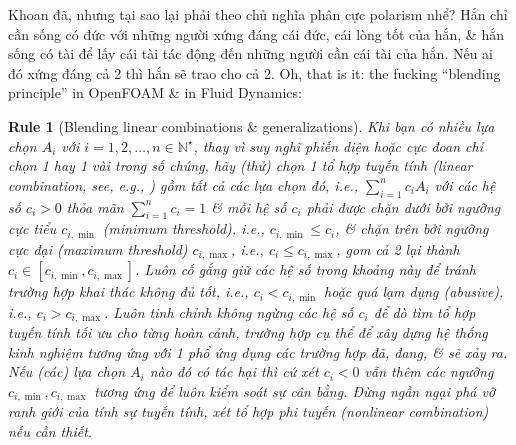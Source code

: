 \documentclass[12pt]{article}
\newtheorem{Rule}{Rule}
\begin{document}
Khoan đã, nhưng tại sao lại phải theo chủ nghĩa phân cực polarism nhể? Hắn chỉ cần sống có đức với những người xứng đáng cái đức, cái lòng tốt của hắn, \& hắn sống có tài để lấy cái tài tác động đến những người cần cái tài của hắn. Nếu ai đó xứng đáng cả 2 thì hắn sẽ trao cho cả 2. Oh, that is it: the fucking ``blending principle'' in OpenFOAM \& in Fluid Dynamics:

\begin{Rule}[Blending linear combinations \& generalizations]
	Khi bạn có nhiều lựa chọn $A_i$ với $i = 1,2,\ldots,n\in\mathbb{N}^\star$, thay vì suy nghĩ phiến diện hoặc cực đoan chỉ chọn 1 hay 1 vài trong số chúng, hãy (thử) chọn 1 tổ hợp tuyến tính (linear combination, see, e.g., {\rm\cite{Hung_linear_algebra,Trefethen_Bau1997,Trefethen_Bau2022}}) gồm tất cả các lựa chọn đó, i.e., $\sum_{i = 1}^n c_iA_i$ với các hệ số $c_i > 0$ thỏa mãn $\sum_{i = 1}^n c_i = 1$ \& mỗi hệ số $c_i$ phải được chặn dưới bởi ngưỡng cực tiểu $c_{i,\min}$ (minimum threshold), i.e., $c_{i,\min}\le c_i$, \& chặn trên bởi ngưỡng cực đại (maximum threshold) $c_{i,\max}$, i.e., $c_i\le c_{i,\max}$, gom cả 2 lại thành $c_i\in[c_{i,\min},c_{i,\max}]$. Luôn cố gắng giữ các hệ số trong khoảng này để tránh trường hợp khai thác không đủ tốt, i.e., $c_i < c_{i,\min}$ hoặc quá lạm dụng (abusive), i.e., $c_i > c_{i,\max}$. Luôn tinh chỉnh không ngừng các hệ số $c_i$ để dò tìm tổ hợp tuyến tính tối ưu cho từng hoàn cảnh, trường hợp cụ thể để xây dựng hệ thống kinh nghiệm tương ứng với 1 phổ ứng dụng các trường hợp đã, đang, \& sẽ xảy ra. Nếu (các) lựa chọn $A_i$ nào đó có tác hại thì cứ xét $c_i < 0$ vẫn thêm các ngưỡng $c_{i,\min},c_{i,\max}$ tương ứng để luôn kiểm soát sự cân bằng. Đừng ngần ngại phá vỡ ranh giới của tính sự tuyến tính, xét tổ hợp phi tuyến (nonlinear combination) nếu cần thiết.
\end{Rule}
\end{document}
